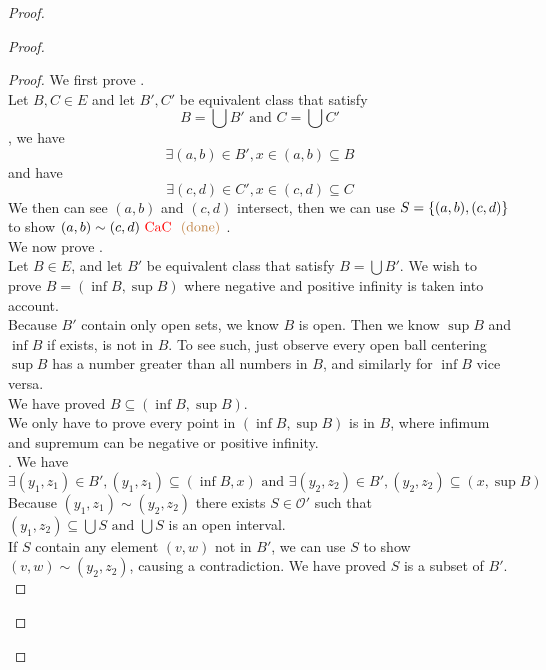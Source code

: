 \documentclass{report}
\begin{document}
\begin{proof}
\begin{proof}
\begin{proof}
We first prove .\\

Let $B,C\in E$ and let $B',C'$ be equivalent class that satisfy
\begin{equation}
B=\bigcup B'\text{ and }C=\bigcup C'
\end{equation}
, we have
\begin{equation}
\exists (a,b)\in B', x\in (a,b)\subseteq B
\end{equation}
and have
\begin{equation}
\exists (c,d)\in C',x \in (c,d)\subseteq C
\end{equation}
We then can see $(a,b)$ and $(c,d)$ intersect, then we can use $S=\{ (a,b),(c,d) \}$ to show $(a,b)\sim (c,d)\text{ \textcolor{red}{CaC} }\textcolor{brown}{\text{ (done) }}$.\\

We now prove  .\\
 
Let $B\in E$, and let $B'$ be equivalent class that satisfy  $B=\bigcup B'$. We wish to prove $B=(\inf B,\sup B)$ where negative and positive infinity is taken into account.\\

Because $B'$ contain only open sets, we know  $B$ is open. Then we know $\sup  B$ and $\inf B$ if exists, is not in $B$. To see such, just observe every open ball centering $\sup B$ has a number greater than all numbers in $B$, and similarly for $\inf B$ vice versa.\\

We have proved $B\subseteq (\inf B,\sup B)$.\\

We only have to prove every point in $(\inf B,\sup  B)$ is in $B$, where infimum and supremum can be negative or positive infinity.\\

. We have
\begin{equation}
\exists (y_1,z_1)\in B', (y_1,z_1)\subseteq (\inf B,x)\text{ and }\exists (y_2,z_2)\in B', (y_2,z_2)\subseteq (x,\sup B)
\end{equation}
Because $(y_1,z_1)\sim (y_2,z_2)$ there exists $S\in \mathcal{O}'$ such that $(y_1,z_2)\subseteq \bigcup S\text{ and }\bigcup S$ is an open interval.\\

If $S$ contain any element  $(v,w)$ not in $B'$, we can use  $S$ to show  $(v,w)\sim (y_2,z_2)$, causing a contradiction. We have proved $S$ is a subset of  $B'$.\\


\end{proof}
\end{proof}
\end{proof}
\end{document}
